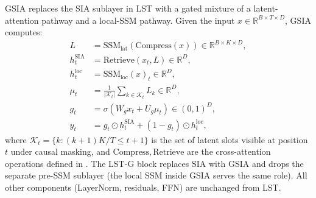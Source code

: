 \documentclass[10pt,twocolumn,letterpaper]{article}
\newcommand{\LST}{\textsc{LST}}
\newcommand{\SIA}{\textsc{SIA}}
\newcommand{\GSIA}{\textsc{GSIA}}
\begin{document}
\GSIA{} replaces the \SIA{} sublayer in \LST{} with a gated mixture of a
latent-attention pathway and a local-SSM pathway.  Given the input
$x\in\mathbb{R}^{B\times T\times D}$, \GSIA{} computes:
\begin{align}
L &= \mathrm{SSM}_{\text{lat}}(\mathrm{Compress}(x)) \in \mathbb{R}^{B\times K\times D},\\
h^{\text{SIA}}_t &= \mathrm{Retrieve}(x_t, L) \in \mathbb{R}^{D},\\
h^{\text{loc}}_t &= \mathrm{SSM}_{\text{loc}}(x)_t \in \mathbb{R}^{D},\\
\mu_t &= \frac{1}{|\mathcal{K}_t|}\sum_{k\in\mathcal{K}_t} L_{k} \in \mathbb{R}^{D},\\
g_t &= \sigma(W_g x_t + U_g \mu_t) \in (0,1)^{D},\\
y_t &= g_t \odot h^{\text{SIA}}_t + (1 - g_t) \odot h^{\text{loc}}_t,
\end{align}
where $\mathcal{K}_t\!=\!\{k : (k\!+\!1)K/T \leq t\!+\!1\}$ is the set
of latent slots visible at position $t$ under causal masking, and
$\mathrm{Compress}, \mathrm{Retrieve}$ are the cross-attention operations
defined in .  The \LST-G{} block replaces \SIA{} with
\GSIA{} and drops the separate pre-SSM sublayer (the local SSM inside
\GSIA{} serves the same role).  All other components (LayerNorm,
residuals, FFN) are unchanged from \LST{}.
\end{document}

